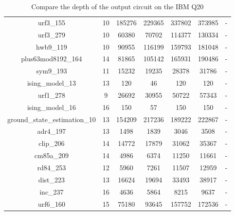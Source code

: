 \documentclass[runningheads]{llncs}
\begin{document}
\begin{table}[H]
\begin{center}
\begin{tabular}{|c|c|c|c|c|c|c|}
									urf3\_155 & 10 & 185276 & 229365 & 337802 & 373985 & - \\
									urf3\_279 & 10 & 60380 & 70702 & 114377 & 130334 & - \\
									hwb9\_119 & 10 & 90955 & 116199 & 159793 & 181048 & - \\
									plus63mod8192\_164 & 14 & 81865 & 105142 & 165931 & 190486 & - \\
									sym9\_193 & 11 & 15232 & 19235 & 28378 & 31786 & - \\
									ising\_model\_13 & 13 & 120 & 46 & 120 & 120 & - \\
									urf1\_278 & 9 & 26692 & 30955 & 50722 & 57343 & - \\
									ising\_model\_16 & 16 & 150 & 57 & 150 & 150 & - \\
									ground\_state\_estimation\_10 & 13 & 154209 & 217236 & 189222 & 222867 & - \\
									adr4\_197 & 13 & 1498 & 1839 & 3046 & 3508 & - \\
									clip\_206 & 14 & 14772 & 17879 & 31062 & 35367 & - \\
									cm85a\_209 & 14 & 4986 & 6374 & 11250 & 11661 & - \\
									rd84\_253 & 12 & 5960 & 7261 & 11507 & 12959 & - \\
									dist\_223 & 13 & 16624 & 19694 & 33493 & 38917 & - \\
									inc\_237 & 16 & 4636 & 5864 & 8215 & 9637 & - \\
									urf6\_160 & 15 & 75180 & 93645 & 157752 & 172536 & - \\
								\hline
									\end{tabular} 
									\end{center}						
									\caption{Compare the depth of the output circuit on the IBM Q20}  
									\label{tab9}
								\end{table}


									
\end{document}
